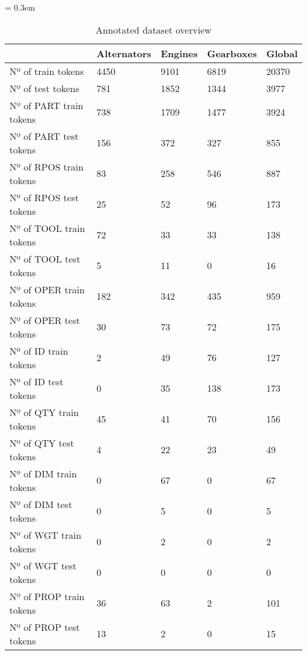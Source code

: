 \begin{table}[t]
	\caption{Annotated dataset overview}
	\tabulinesep = 0.3em
	\setlength{\tabcolsep}{0.2em}
	\centering
	\begin{tabu} { X[3.0,l,m] X[1.3,r,m] X[r,m] X[1.2,r,m] X[r,m] }
		\rowfont{\bfseries\itshape} & Alternators & Engines & Gearboxes & Global \\
		\hline
		Nº of train tokens & 4450 & 9101 & 6819 & 20370 \\
		Nº of test tokens & 781 & 1852 & 1344 & 3977 \\
		Nº of PART train tokens & 738 & 1709 & 1477 & 3924 \\
		Nº of PART test tokens & 156 & 372 & 327 & 855 \\
		Nº of RPOS train tokens & 83 & 258 & 546 & 887 \\
		Nº of RPOS test tokens & 25 & 52 & 96 & 173 \\
		Nº of TOOL train tokens & 72 & 33 & 33 & 138 \\
		Nº of TOOL test tokens & 5 & 11 & 0 & 16 \\
		Nº of OPER train tokens & 182 & 342 & 435 & 959 \\
		Nº of OPER test tokens & 30 & 73 & 72 & 175 \\
		Nº of ID train tokens & 2 & 49 & 76 & 127 \\
		Nº of ID test tokens & 0 & 35 & 138 & 173 \\
		Nº of QTY train tokens & 45 & 41 & 70 & 156 \\
		Nº of QTY test tokens & 4 & 22 & 23 & 49 \\
		Nº of DIM train tokens & 0 & 67 & 0 & 67 \\
		Nº of DIM test tokens & 0 & 5 & 0 & 5 \\
		Nº of WGT train tokens & 0 & 2 & 0 & 2 \\
		Nº of WGT test tokens & 0 & 0 & 0 & 0 \\
		Nº of PROP train tokens & 36 & 63 & 2 & 101 \\
		Nº of PROP test tokens & 13 & 2 & 0 & 15 \\
	\end{tabu}
	\label{tab:dataset-sources_annotated-dataset-overview}
\end{table}
